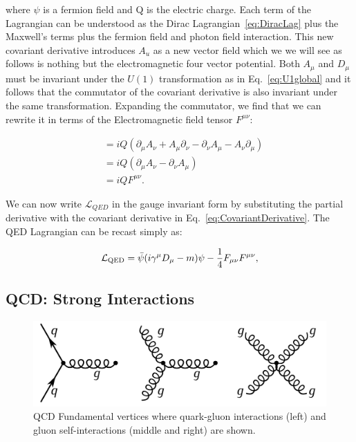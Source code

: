 where $\psi$ is a fermion field and Q is the electric charge. Each term of the Lagrangian can be understood as the Dirac Lagrangian~\ref{eq:DiracLag} plus the Maxwell's terms plus the fermion field and photon field interaction. This new covariant derivative introduces $A_{u}$ as a new vector field which we we will see as follows is nothing but the electromagnetic four vector potential. Both $A_\mu$ and $D_\mu$ must be invariant under the $U(1)$ transformation as in Eq.~\ref{eq:U1global} and it follows that the commutator of the covariant derivative is also invariant under the same transformation. Expanding the commutator, we find that we can rewrite it in terms of the Electromagnetic field tensor $F^{\mu\nu}$:


\begin{align*}
    [D_\mu, D_\nu] &= iQ(\partial_\mu A_\nu + A_\mu \partial_\nu - \partial_\nu A_\mu - A_\nu \partial_\mu) \\
    &= iQ(\partial_\mu A_\nu - \partial_\nu A_\mu) \\ 
    &= iQ F^{\mu\nu}.
\end{align*}


We can now write $\mathcal{L}_{QED}$ in the gauge invariant form by substituting the partial derivative with the covariant derivative in Eq.~\ref{eq:CovariantDerivative}.  The QED Lagrangian can be recast simply as:

\begin{equation}
\label{eq:QEDLagrangian}
\mathcal{L}_{\textnormal{QED}} = \bar{\psi} (i \gamma^{\mu} D_{\mu} - m) \psi - \frac{1}{4} F_{\mu\nu} F^{\mu\nu},
\end{equation}

\subsection{QCD: Strong Interactions}

\begin{figure}[ht]
	\centering
    \includegraphics[scale=0.4]{fig/QCDFundamentalVertices.png}
	\caption{QCD Fundamental vertices where quark-gluon interactions (left) and gluon self-interactions (middle and right) are shown.}
	\label{fig:QCDFundamentalVertices}
\end{figure}

